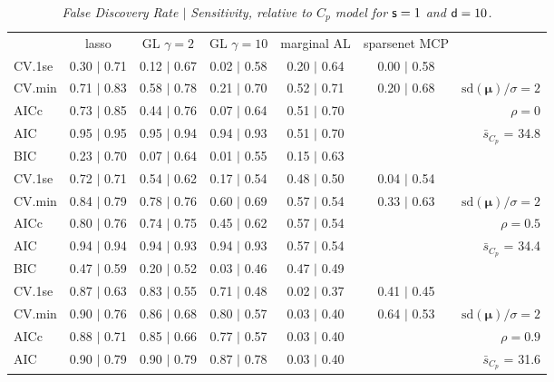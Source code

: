 \documentclass[12pt]{article}
\newcommand{\mr}[1]{\mathrm{#1}}
\newcommand{\bm}[1]{\mathbf{#1}}
\begin{document}
\begin{table}[p]\vspace{-.5cm}
\caption[l]{\label{sens}\it False Discovery Rate $\mid$ Sensitivity, relative to $C_p$ model  for ${\sf s}=1$ and ${\sf d}=10$.}
\vspace{-.5cm}
\small{}
\begin{center}
\begin{tabular}{l*{5}{c}|r}
 & lasso & GL $\gamma=2$ & GL $\gamma=10$ & marginal AL & sparsenet MCP  & \\
 \cline{1-7}
CV.1se & 0.30 $\mid$ 0.71 & 0.12 $\mid$ 0.67 & 0.02 $\mid$ 0.58 & 0.20 $\mid$ 0.64 & 0.00 $\mid$ 0.58 &\\
CV.min & 0.71 $\mid$ 0.83 & 0.58 $\mid$ 0.78 & 0.21 $\mid$ 0.70 & 0.52 $\mid$ 0.71 & 0.20 $\mid$ 0.68 &  $\mr{sd}(\bm{\mu})/\sigma=2$ \\
AICc & 0.73 $\mid$ 0.85 & 0.44 $\mid$ 0.76 & 0.07 $\mid$ 0.64 & 0.51 $\mid$ 0.70 & & $\rho=0$ \\
AIC & 0.95 $\mid$ 0.95 & 0.95 $\mid$ 0.94 & 0.94 $\mid$ 0.93 & 0.51 $\mid$ 0.70 & & \multirow{2}{*}{$\bar{s}_{C_p}$ = 34.8} \\
BIC & 0.23 $\mid$ 0.70 & 0.07 $\mid$ 0.64 & 0.01 $\mid$ 0.55 & 0.15 $\mid$ 0.63 & & \\
 \hline 
CV.1se & 0.72 $\mid$ 0.71 & 0.54 $\mid$ 0.62 & 0.17 $\mid$ 0.54 & 0.48 $\mid$ 0.50 & 0.04 $\mid$ 0.54 &\\
CV.min & 0.84 $\mid$ 0.79 & 0.78 $\mid$ 0.76 & 0.60 $\mid$ 0.69 & 0.57 $\mid$ 0.54 & 0.33 $\mid$ 0.63 &  $\mr{sd}(\bm{\mu})/\sigma=2$ \\
AICc & 0.80 $\mid$ 0.76 & 0.74 $\mid$ 0.75 & 0.45 $\mid$ 0.62 & 0.57 $\mid$ 0.54 & & $\rho=0.5$ \\
AIC & 0.94 $\mid$ 0.94 & 0.94 $\mid$ 0.93 & 0.94 $\mid$ 0.93 & 0.57 $\mid$ 0.54 & & \multirow{2}{*}{$\bar{s}_{C_p}$ = 34.4} \\
BIC & 0.47 $\mid$ 0.59 & 0.20 $\mid$ 0.52 & 0.03 $\mid$ 0.46 & 0.47 $\mid$ 0.49 & & \\
 \hline 
CV.1se & 0.87 $\mid$ 0.63 & 0.83 $\mid$ 0.55 & 0.71 $\mid$ 0.48 & 0.02 $\mid$ 0.37 & 0.41 $\mid$ 0.45 &\\
CV.min & 0.90 $\mid$ 0.76 & 0.86 $\mid$ 0.68 & 0.80 $\mid$ 0.57 & 0.03 $\mid$ 0.40 & 0.64 $\mid$ 0.53 &  $\mr{sd}(\bm{\mu})/\sigma=2$ \\
AICc & 0.88 $\mid$ 0.71 & 0.85 $\mid$ 0.66 & 0.77 $\mid$ 0.57 & 0.03 $\mid$ 0.40 & & $\rho=0.9$ \\
AIC & 0.90 $\mid$ 0.79 & 0.90 $\mid$ 0.79 & 0.87 $\mid$ 0.78 & 0.03 $\mid$ 0.40 & & \multirow{2}{*}{$\bar{s}_{C_p}$ = 31.6} \\

\end{tabular}
\end{center}
\end{table}
\end{document}
